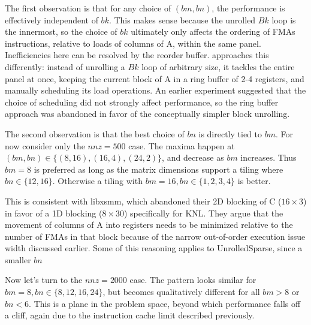 The first observation is that for any choice of $(bm, bn)$, the performance is effectively independent of $bk$. This makes sense because the unrolled $Bk$ loop is the innermost, so the choice of $bk$ ultimately only affects the ordering of \glspl{FMA} instructions, relative to loads of columns of A, within the same panel. Inefficiencies here can be resolved by the reorder buffer.  approaches this differently: instead of unrolling a $Bk$ loop of arbitrary size, it tackles the entire panel at once, keeping the current block of A in a ring buffer of 2-4 registers, and manually scheduling its load operations. An earlier experiment suggested that the choice of scheduling did not strongly affect performance, so the ring buffer approach was abandoned in favor of the conceptually simpler block unrolling.

The second observation is that the best choice of $bn$ is directly tied to $bm$. For now consider only the $nnz=500$ case. The maxima happen at $(bm,bn) \in \{(8,16), (16,4), (24,2)\}$, and decrease as $bm$ increases. Thus $bm=8$ is preferred as long as the matrix dimensions support a tiling where $bn \in \{12,16\}$. Otherwise a tiling with $bm=16, bn\in\{1,2,3,4\}$ is better. 

This is consistent with libxsmm, which abandoned their 2D blocking of C ($16 \times 3$) in favor of a 1D blocking ($8 \times 30$) specifically for \gls{KNL}. They argue that the movement of columns of A into registers needs to be minimized relative to the number of FMAs in that block because of the narrow out-of-order execution issue width discussed earlier. Some of this reasoning applies to UnrolledSparse, since a smaller $bn$ 

Now let's turn to the $nnz=2000$ case. The pattern looks similar for $bm=8, bn\in\{8,12,16,24\}$, but becomes qualitatively different for all $bm > 8$ or $bn < 6$. This is a plane in the problem space, beyond which performance falls off a cliff, again due to the instruction cache limit described previously.


